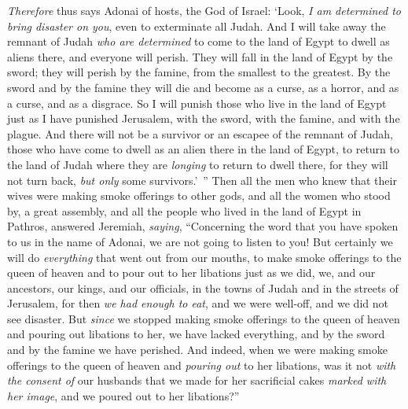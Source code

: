 \begin{biblechapter}
\verse \textit{Therefore} thus says Adonai of hosts, the God of Israel: ‘Look, \textit{I am determined to bring disaster on you}, even to exterminate all Judah.
\verse And I will take away the remnant of Judah \textit{who are determined} to come to the land of Egypt to dwell as aliens there, and everyone will perish. They will fall in the land of Egypt by the sword; they will perish by the famine, from the smallest to the greatest. By the sword and by the famine they will die and become as a curse, as a horror, and as a curse, and as a disgrace.
\verse So I will punish those who live in the land of Egypt just as I have punished Jerusalem, with the sword, with the famine, and with the plague.
\verse And there will not be a survivor or an escapee of the remnant of Judah, those who have come to dwell as an alien there in the land of Egypt, to return to the land of Judah where they are \textit{longing} to return to dwell there, for they will not turn back, \textit{but only} some survivors.’ ”
\verse Then all the men who knew that their wives were making smoke offerings to other gods, and all the women who stood by, a great assembly, and all the people who lived in the land of Egypt in Pathros, answered Jeremiah, \textit{saying},
\verse “Concerning the word that you have spoken to us in the name of Adonai, we are not going to listen to you!
\verse But certainly we will do \textit{everything} that went out from our mouths, to make smoke offerings to the queen of heaven and to pour out to her libations just as we did, we, and our ancestors, our kings, and our officials, in the towns of Judah and in the streets of Jerusalem, for then \textit{we had enough to eat}, and we were well-off, and we did not see disaster.
\verse But \textit{since} we stopped making smoke offerings to the queen of heaven and pouring out libations to her, we have lacked everything, and by the sword and by the famine we have perished.
\verse And indeed, when we were making smoke offerings to the queen of heaven and \textit{pouring out} to her libations, was it not \textit{with the consent of} our husbands that we made for her sacrificial cakes \textit{marked with her image}, and we poured out to her libations?”

\end{biblechapter}
